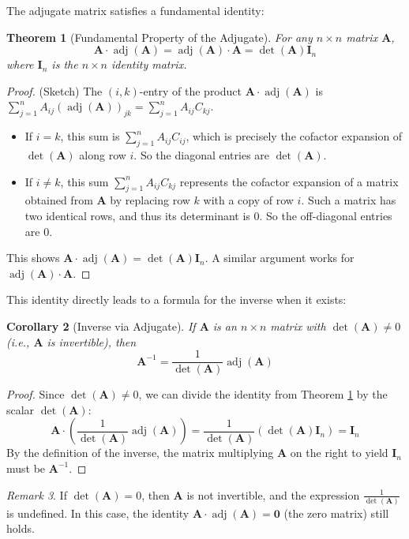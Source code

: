 \documentclass[11pt]{article}
\newtheorem{theorem}{Theorem}[section]
\newtheorem{corollary}[theorem]{Corollary}
\theoremstyle{definition}
\theoremstyle{remark}
\newtheorem{remark}[theorem]{Remark}
\DeclareMathOperator{\adj}{adj}
\DeclareMathOperator{\det}{det}
\newcommand{\mat}[1]{\mathbf{#1}} %
\begin{document}
The adjugate matrix satisfies a fundamental identity:

\begin{theorem}[Fundamental Property of the Adjugate] \label{thm:adj_identity}
For any $n \times n$ matrix $\mat{A}$,
\[ \mat{A} \cdot \adj(\mat{A}) = \adj(\mat{A}) \cdot \mat{A} = \det(\mat{A}) \mat{I}_n \]
where $\mat{I}_n$ is the $n \times n$ identity matrix.
\end{theorem}

\begin{proof} (Sketch)
The $(i,k)$-entry of the product $\mat{A} \cdot \adj(\mat{A})$ is $\sum_{j=1}^n A_{ij} (\adj(\mat{A}))_{jk} = \sum_{j=1}^n A_{ij} C_{kj}$.
\begin{itemize}
    \item If $i=k$, this sum is $\sum_{j=1}^n A_{ij} C_{ij}$, which is precisely the cofactor expansion of $\det(\mat{A})$ along row $i$. So the diagonal entries are $\det(\mat{A})$.
    \item If $i \neq k$, this sum $\sum_{j=1}^n A_{ij} C_{kj}$ represents the cofactor expansion of a matrix obtained from $\mat{A}$ by replacing row $k$ with a copy of row $i$. Such a matrix has two identical rows, and thus its determinant is 0. So the off-diagonal entries are 0.
\end{itemize}
This shows $\mat{A} \cdot \adj(\mat{A}) = \det(\mat{A}) \mat{I}_n$. A similar argument works for $\adj(\mat{A}) \cdot \mat{A}$.
\end{proof}

This identity directly leads to a formula for the inverse when it exists:

\begin{corollary}[Inverse via Adjugate]
If $\mat{A}$ is an $n \times n$ matrix with $\det(\mat{A}) \neq 0$ (i.e., $\mat{A}$ is invertible), then
\[ \mat{A}^{-1} = \frac{1}{\det(\mat{A})} \adj(\mat{A}) \]
\end{corollary}

\begin{proof}
Since $\det(\mat{A}) \neq 0$, we can divide the identity from Theorem \ref{thm:adj_identity} by the scalar $\det(\mat{A})$:
\[ \mat{A} \cdot \left( \frac{1}{\det(\mat{A})} \adj(\mat{A}) \right) = \frac{1}{\det(\mat{A})} (\det(\mat{A}) \mat{I}_n) = \mat{I}_n \]
By the definition of the inverse, the matrix multiplying $\mat{A}$ on the right to yield $\mat{I}_n$ must be $\mat{A}^{-1}$.
\end{proof}

\begin{remark}
If $\det(\mat{A}) = 0$, then $\mat{A}$ is not invertible, and the expression $\frac{1}{\det(\mat{A})}$ is undefined. In this case, the identity $\mat{A} \cdot \adj(\mat{A}) = \mat{0}$ (the zero matrix) still holds.
\end{remark}
\end{document}
